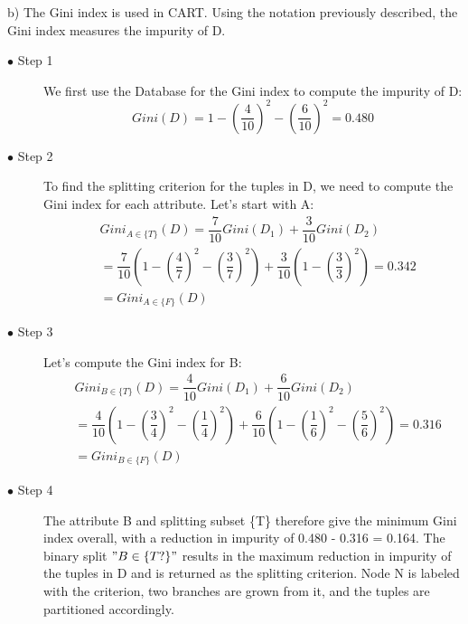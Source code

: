 \documentclass[a4paper]{article}
\begin{document}
b)
\newline
The Gini index is used in CART. Using the notation previously described, the Gini index measures the impurity of D.

\begin{description}
    \item[$\bullet$ Step 1] We first use the Database for the Gini index to compute the impurity of D:
    \[ Gini(D)
      = 1 - \left(\dfrac{4}{10}\right)^2 - \left(\dfrac{6}{10}\right)^2 = 0.480
    \]

    \item[$\bullet$ Step 2] To find the splitting criterion for the tuples in D, we need to compute the Gini index for each attribute. Let's start with A:
    \begin{equation}
    \begin{split}
    &Gini_{A\in \{T\}}(D) = \dfrac{7}{10}Gini(D_1) + \dfrac{3}{10}Gini(D_2) \\
      &= \dfrac{7}{10} ( 1 - \left(\dfrac{4}{7}\right)^2 - \left(\dfrac{3}{7}\right)^2) + \dfrac{3}{10}(1 - \left(\dfrac{3}{3}\right)^2)
      = 0.342 \\ &= Gini_{A\in \{F\}}(D)
    \end{split}
    \end{equation}

    \item[$\bullet$ Step 3] Let's compute the Gini index for B:
    \begin{equation}
    \begin{split}
    &Gini_{B\in \{T\}}(D) = \dfrac{4}{10}Gini(D_1) + \dfrac{6}{10}Gini(D_2) \\
      &= \dfrac{4}{10} ( 1 - \left(\dfrac{3}{4}\right)^2 - \left(\dfrac{1}{4}\right)^2) + \dfrac{6}{10}(1 - \left(\dfrac{1}{6}\right)^2 - \left(\dfrac{5}{6}\right)^2)
      = 0.316 \\ &= Gini_{B\in \{F\}}(D)
    \end{split}
    \end{equation}

    \item[$\bullet$ Step 4] The attribute B and splitting subset \{T\} therefore give the minimum Gini index overall, with a reduction in impurity of 0.480 - 0.316 = 0.164.  The binary split $"B\in \{T?\}"$ results in the maximum reduction in impurity of the tuples in D and is returned as the splitting criterion. Node N is labeled with the criterion, two branches are grown from it, and the tuples are partitioned accordingly.

\end{description}
\end{document}
